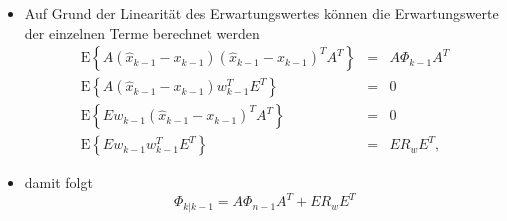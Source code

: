 \documentclass[slidestop,compress,mathserif]{beamer}
\begin{document}
{\begin{itemize}
\begin{equation}
\begin{split}
-   {A} \left( \hat{ {x}}_{k-1} -  {x}_{k-1} \right)  {w}_{k-1}^T  {E}^T \\
&+  {E w}_{k-1} \left( \hat{ {x}}_{k-1} -  {x}_{k-1} \right)^T  {A}^T +  {E w}_{k-1}  {w}_{k-1}^T  {E}^T
\end{split}
\end{equation}
\item Auf Grund der Linearit\"at des Erwartungswertes k\"onnen die Erwartungswerte der einzelnen Terme berechnet werden
\begin{eqnarray}
\mathrm{E} \left\{ {A} \left( \hat{{x}}_{k-1} - {x}_{k-1} \right) 
\left( \hat{{x}}_{k-1} - {x}_{k-1} \right)^T {A}^T \right\} & = & {A} \Phi_{k-1} {A}^T \\
\mathrm{E} \left\{ {A} \left( \hat{{x}}_{k-1} - {x}_{k-1} \right) {w}_{k-1}^T {E}^T \right\} & = & 0 \\
\mathrm{E} \left\{ {E w}_{k-1} \left( \hat{{x}}_{k-1} - {x}_{k-1} \right)^T {A}^T \right\} & = & 0 \\
\mathrm{E} \left\{ {E w}_{k-1} {w}_{k-1}^T {E}^T \right\} & = & {E} {R}_w {E}^T,
\end{eqnarray}
\item damit folgt
\begin{equation}
\label{Eqn-KFSECovMatFinal}
\Phi_{k|k-1} =  {A} \Phi_{n-1} {A}^T  + {E} {R}_w {E}^T
\end{equation}
\end{itemize}
}

\end{document}
